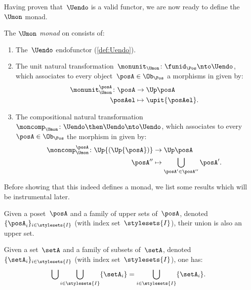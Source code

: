 Having proven that~$\Uendo$ is a valid functor, we are now ready to define the~$\Umon$ monad.
\begin{definition}
    \label{def:Umon}
    The \emph{$\Umon$ monad} on \Pos consists of:
    \begin{enumerate}
        \item The~$\Uendo$ endofunctor (\cref{def:Uendo}).
        \item The unit natural transformation~$\monunit_{\Umon} \colon \funid_{\Pos}\nto \Uendo$, which associates to every object~$\posA \in \Ob_\Pos$ a morphisms in \Pos given by:
              \begin{equation}
                  \begin{aligned}
                      \monunit_{\Umon}^\posA\colon \posA & \to \Up \posA \\
                      \posAel                            & \mapsto \upit \{\posAel\}.
                  \end{aligned}
              \end{equation}
        \item The compositional natural transformation~$\moncomp_{\Umon}\colon \Uendo\then \Uendo\nto \Uendo$, which associates to every~$\posA\in \Ob_\Pos$ the morphism in \Pos given by:
              \begin{equation}
                  \begin{aligned}
                      \moncomp_{\Umon}^\posA\colon \Up{(\Up{\posA})} & \to \Up \posA \\
                      \posA''                                        & \mapsto \bigcup_{\posA'\in \posA''}\posA'.
                  \end{aligned}
              \end{equation}
    \end{enumerate}
\end{definition}

Before showing that this indeed defines a monad, we list some results which will be instrumental later.
\begin{lemma}
    \label{lem:upperunionupper}
    Given a poset~$\posA$ and a family of upper sets of~$\posA$, denoted~$\{\posA_i\}_{i\in \stylesets{I}}$ (with index set~$\stylesets{I}$), their union is also an upper set.
\end{lemma}

\begin{lemma}
    \label{lem:setunionset}
    Given a set~$\setA$ and a family of subsets of~$\setA$, denoted~$\{\setA_i\}_{i\in \stylesets{I}}$ (with index set~$\stylesets{I}$), one has:
    \begin{equation}
        \bigcup \bigcup_{i\in \stylesets{I}}\{\setA_i\} = \bigcup_{i\in \stylesets{I}}\{\setA_i\}.
    \end{equation}
\end{lemma}

